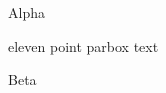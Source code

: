 \documentclass[11pt]{article}
\begin{document}
Alpha  \parbox{3cm}{eleven point parbox text} Beta
\end{document}
